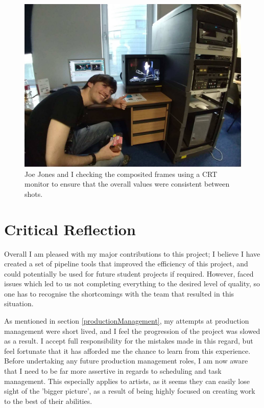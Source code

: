 \documentclass[11pt]{article}
\begin{document}
\begin{figure}[htbp]\centering
	\includegraphics[width=1.0\linewidth]{images/joe_with_crt.jpg}
	\caption{\label{figure:joewithcrt} Joe Jones and I checking the composited frames using a CRT monitor to ensure that the overall values were consistent between shots.}
\end{figure}

\newpage

\section{Critical Reflection}

Overall I am pleased with my major contributions to this project; I believe I have created a set of pipeline tools that improved the efficiency of this project, and could potentially be used for future student projects if required. However, faced issues which led to us not completing everything to the desired level of quality, so one has to recognise the shortcomings with the team that resulted in this situation.

As mentioned in section \ref{productionManagement}, my attempts at production management were short lived, and I feel the progression of the project was slowed as a result. I accept full responsibility for the mistakes made in this regard, but feel fortunate that it has afforded me the chance to learn from this experience. Before undertaking any future production management roles, I am now aware that I need to be far more assertive in regards to scheduling and task management. This especially applies to artists, as it seems they can easily lose sight of the 'bigger picture', as a result of being highly focused on creating work to the best of their abilities.
\end{document}
